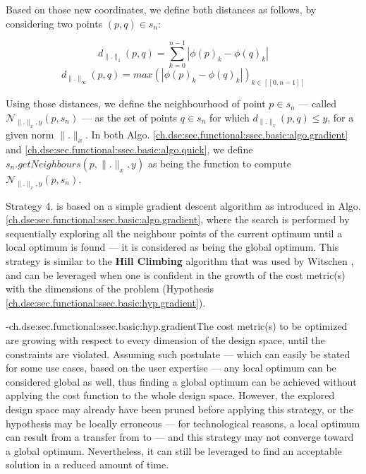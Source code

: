         Based on those new coordinates, we define both distances as follows, by considering two points $(p, q) \in s_n$:
        
        \begin{equation}
            \label{ch.dse:sec.functional:ssec.basic:eq.distOne}
            d_{\|.\|_1}(p, q) = \sum_{k=0}^{n-1}|\phi(p)_k - \phi(q)_k|
        \end{equation}
        \begin{equation}
            \label{ch.dse:sec.functional:ssec.basic:eq.distInf}
            d_{\|.\|_\infty}(p, q) = max(|\phi(p)_k - \phi(q)_k|)_{k \in [\![0, n-1]\!]} 
        \end{equation}

\clearpage
        Using those distances, we define the neighbourhood of point $p \in s_n$ --- called $\mathcal{N}_{\|.\|_x, y}(p, s_n)$ --- as the set of points $q \in s_n$ for which $d_{\|.\|_x}(p, q) \le y$, for a given norm $\|.\|_x$.
        In both Algo. \ref{ch.dse:sec.functional:ssec.basic:algo.gradient} and \ref{ch.dse:sec.functional:ssec.basic:algo.quick}, we define {\tt $s_n.getNeighbours(p, \|.\|_x, y)$} as being the function to compute $\mathcal{N}_{\|.\|_x, y}(p, s_n)$.

        Strategy 4. is based on a simple gradient descent algorithm as introduced in Algo. \ref{ch.dse:sec.functional:ssec.basic:algo.gradient}, where the search is performed by sequentially exploring all the neighbour points of the current optimum until a local optimum is found --- it is considered as being the global optimum.
        This strategy is similar to the {\bf Hill Climbing} algorithm that was used by Witschen \etal{} \cite{witschen_circa_2019}, and can be leveraged when one is confident in the growth of the cost metric(s) with the dimensions of the problem (Hypothesis \ref{ch.dse:sec.functional:ssec.basic:hyp.gradient}).

        \hyp{ch.dse:sec.functional:ssec.basic:hyp.gradient}{The cost metric(s) to be optimized are growing with respect to every dimension of the design space, until the constraints are violated.}
        Assuming such postulate --- which can easily be stated for some use cases, based on the user expertise --- any local optimum can be considered global as well, thus finding a global optimum can be achieved without applying the cost function to the whole design space.
        However, the explored design space may already have been pruned before applying this strategy, or the hypothesis may be locally erroneous --- \eg for technological reasons, a local optimum can result from a transfer from  to  --- and this strategy may not converge toward a global optimum.
        Nevertheless, it can still be leveraged to find an acceptable solution in a reduced amount of time. 

